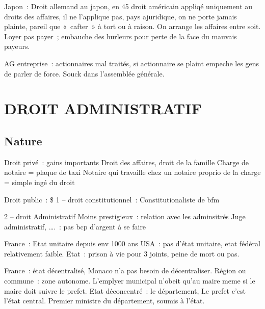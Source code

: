 \documentclass[a4paper,12pt]{article}
\begin{document}
Japon : Droit allemand au japon, en 45 droit américain appliqé uniquement au droits des affaires, il ne l’applique pas, pays ajuridique, on ne porte jamais plainte, pareil que « cafter » à tort ou à raison. On arrange les affaires entre soit. Loyer pas payer ; embauche des hurleurs pour perte de la face du mauvais payeurs. 

AG entreprise : actionnaires mal traités, si actionnaire se plaint empeche les gens de parler de force. Souck dans l’assemblée générale. 



























\section{DROIT ADMINISTRATIF}


\subsection{Nature}





Droit privé : gains importants 
Droit des affaires, droit de la famille
Charge de notaire = plaque de taxi
Notaire qui travaille chez un notaire proprio de la charge = simple ingé du droit

Droit public : \$
1 – droit constitutionnel :
Constitutionaliste de bfm

2 – droit Administratif
Moins prestigieux : relation avec les adminsitrés
Juge administratif, …. : pas bcp d’argent à se faire

France : Etat unitaire depuis env 1000 ans
USA : pas d’état unitaire, etat fédéral relativement faible. 
Etat : prison à vie pour 3 joints, peine de mort ou pas.

France : état décentralisé, Monaco n’a pas besoin de décentraliser.
Région ou commune : zone autonome.
L’emplyer municipal n’obeit qu’au maire meme si le maire doit suivre le prefet.
Etat déconcentré : le département, Le prefet c’est l’état central. Premier ministre du département, soumis à l’état.
\end{document}
